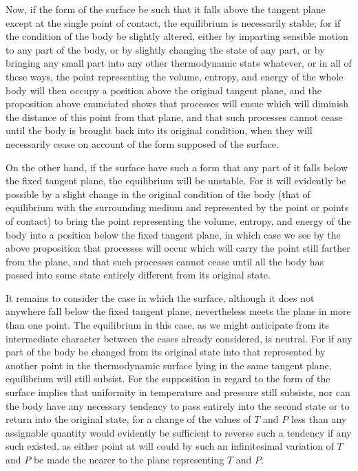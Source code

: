 \documentclass[11pt]{article}
\begin{document}
Now, if the form of the surface be such that it falls above the tangent plane except at the single point of contact, the equilibrium is necessarily stable; for if the condition of the body be slightly altered, either by imparting sensible motion to any part of the body, or by slightly changing the state of any part, or by bringing any small part into any other thermodynamic state whatever, or in all of these ways, the point representing the volume, entropy, and energy of the whole body will then occupy a position above the original tangent plane, and the proposition above enunciated shows that processes will ensue which will diminish the distance of this point from that plane, and that such processes cannot cease until the body is brought back into its original condition, when they will necessarily cease on account of the form supposed of the surface.

On the other hand, if the surface have such a form that any part of it falls below the fixed tangent plane, the equilibrium will be unstable. For it will evidently be possible by a slight change in the original condition of the body (that of equilibrium with the surrounding medium and represented by the point or points of contact) to bring the point representing the volume, entropy, and energy of the body into a position below the fixed tangent plane, in which case we see by the above proposition that processes will occur which will carry the point still farther from the plane, and that such processes cannot cease until all the body has passed into some state entirely different from its original state.

It remains to consider the case in which the surface, although it does not anywhere fall below the fixed tangent plane, nevertheless meets the plane in more than one point. The equilibrium in this case, as we might anticipate from its intermediate character between the cases already considered, is neutral. For if any part of the body be changed from its original state into that represented by another point in the thermodynamic surface lying in the same tangent plane, equilibrium will still subsist. For the supposition in regard to the form of the surface implies that uniformity in temperature and pressure still subsists, nor can the body have any necessary tendency to pass entirely into the second state or to return into the original state, for a change of the values of $T$ and $P$ less than any assignable quantity would evidently be sufficient to reverse such a tendency if any such existed, as either point at will could by such an infinitesimal variation of $T$ and $P$ be made the nearer to the plane representing $T$ and $P$.
\end{document}
